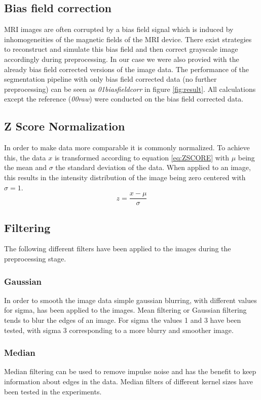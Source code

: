 \documentclass[journal]{IEEEtran}
\begin{document}
\subsection{Bias field correction}
MRI images are often corrupted by a bias field signal which is induced by inhomogeneities of the magnetic fields of the MRI device. There exist strategies to reconstruct and simulate this bias field and then correct grayscale image accordingly during preprocessing. In our case we were also provied with the already bias field corrected versions of the image data. The performance of the segmentation pipeline with only bias field corrected data (no further preprocessing) can be seen as \textit{01biasfieldcorr} in figure \ref{fig:result}. All calculations except the reference (\textit{00raw}) were conducted on the bias field corrected data.

\subsection{Z Score Normalization}
In order to make data more comparable it is commonly normalized. To achieve this, the data $x$ is transformed according to equation \ref{eq:ZSCORE} with $\mu$ being the mean and $\sigma$ the standard deviation of the data. When applied to an image, this results in the intensity distribution of the image being zero centered with $\sigma = 1$.
\begin{equation}
    \label{eq:ZSCORE}
    z = \frac{x - \mu}{\sigma}{}
\end{equation}

\subsection{Filtering}
The following different filters have been applied to the images during the preprocessing stage.
\subsubsection{Gaussian}
In order to smooth the image data simple gaussian blurring, with different values for sigma, has been applied to the images. Mean filtering or Gaussian filtering tends to blur the edges of an image. For sigma the values 1 and 3 have been tested, with sigma 3 corresponding to a more blurry and smoother image.
\subsubsection{Median}
Median filtering can be used to remove impulse noise and has the benefit to keep information about edges in the data. Median filters of different kernel sizes have been tested in the experiments.
\end{document}

